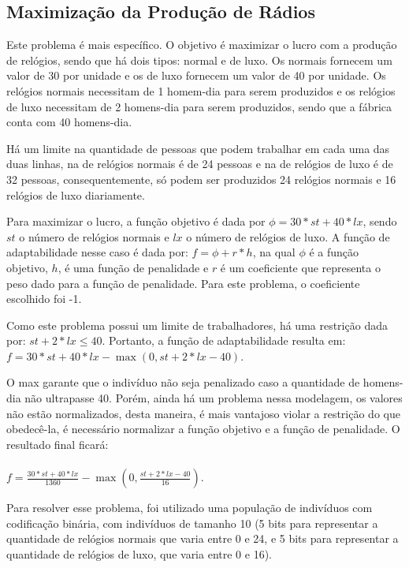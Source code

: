 \documentclass[12pt]{article}
\begin{document}
\subsection{Maximização da Produção de Rádios}

Este problema é mais específico. O objetivo é maximizar o lucro com a produção de relógios, sendo que 
há dois tipos: normal e de luxo. Os normais fornecem um valor de 30 por unidade e os de luxo fornecem um 
valor de 40 por unidade. Os relógios normais necessitam de 1 homem-dia para serem produzidos e os 
relógios de luxo necessitam de 2 homens-dia para serem produzidos, sendo que a fábrica conta com 
40 homens-dia. 

Há um limite na quantidade de pessoas que podem trabalhar em cada uma das duas linhas, na de relógios 
normais é de 24 pessoas e na de relógios de luxo é de 32 pessoas, consequentemente, só podem ser 
produzidos 24 relógios normais e 16 relógios de luxo diariamente.

Para maximizar o lucro, a função objetivo é dada por $\phi = 30 * st + 40 * lx$, sendo $st$ o número 
de relógios normais e $lx$ o número de relógios de luxo. A função de adaptabilidade nesse caso é dada 
por: $f = \phi + r * h$, na qual $\phi$ é a função objetivo, $h$, é uma função de penalidade e $r$ é 
um coeficiente que representa o peso dado para a função de penalidade. Para este problema, o coeficiente 
escolhido foi -1.

Como este problema possui um limite de trabalhadores, há uma restrição dada por: $st + 2 * lx \leq 40$. 
Portanto, a função de adaptabilidade resulta em: \\ $f = 30 * st + 40 * lx - \max(0,st + 2 * lx - 40)$.

O max garante que o indivíduo não seja penalizado caso a quantidade de homens-dia não ultrapasse 40. 
Porém, ainda há um problema nessa modelagem, os valores não estão normalizados, desta maneira, é mais 
vantajoso violar a restrição do que obedecê-la, é necessário normalizar a função objetivo e a 
função de penalidade. O resultado final ficará: \\ \\ $f = \frac{30 * st + 40 * lx}{1360} - 
\max(0,\frac{st + 2 * lx - 40}{16})$.

Para resolver esse problema, foi utilizado uma população de indivíduos com codificação binária, com 
indivíduos de tamanho 10 (5 bits para representar a quantidade de relógios normais que varia entre 0 
e 24, e 5 bits para representar a quantidade de relógios de luxo, que varia entre 0 e 16).
\end{document}
